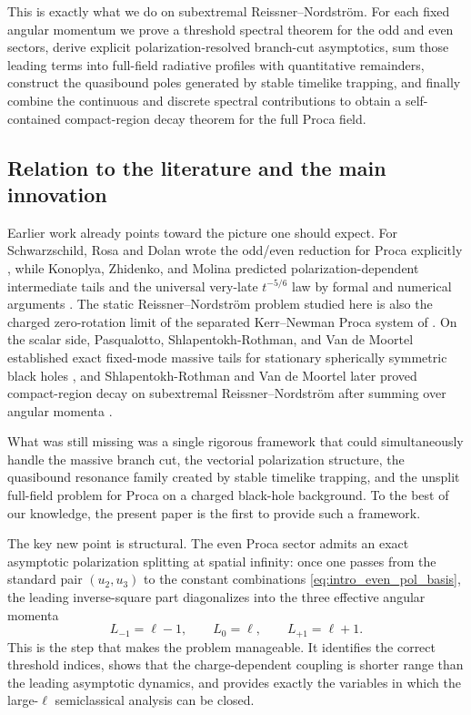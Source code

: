 \documentclass[12pt]{article}
\numberwithin{equation}{section}
\theoremstyle{plain}
\theoremstyle{definition}
\theoremstyle{remark}
\begin{document}
This is exactly what we do on subextremal Reissner--Nordstr\"om.  For each fixed angular momentum we prove a threshold spectral theorem for the odd and even sectors, derive explicit polarization-resolved branch-cut asymptotics, sum those leading terms into full-field radiative profiles with quantitative remainders, construct the quasibound poles generated by stable timelike trapping, and finally combine the continuous and discrete spectral contributions to obtain a self-contained compact-region decay theorem for the full Proca field.

\subsection{Relation to the literature and the main innovation}

Earlier work already points toward the picture one should expect.  For Schwarzschild, Rosa and Dolan wrote the odd/even reduction for Proca explicitly \cite{RosaDolan2012}, while Konoplya, Zhidenko, and Molina predicted polarization-dependent intermediate tails and the universal very-late $t^{-5/6}$ law by formal and numerical arguments \cite{KonoplyaZhidenkoMolina2007}.  The static Reissner--Nordstr\"om problem studied here is also the charged zero-rotation limit of the separated Kerr--Newman Proca system of \cite{CayusoDiasGrayKubiznakMargalitSantosSouzaThiele2020}.  On the scalar side, Pasqualotto, Shlapentokh-Rothman, and Van de Moortel established exact fixed-mode massive tails for stationary spherically symmetric black holes \cite{PasqualottoShlapentokhRothmanVanDeMoortel2024}, and Shlapentokh-Rothman and Van de Moortel later proved compact-region decay on subextremal Reissner--Nordstr\"om after summing over angular momenta \cite{ShlapentokhRothmanVanDeMoortel2026}.

What was still missing was a single rigorous framework that could simultaneously handle the massive branch cut, the vectorial polarization structure, the quasibound resonance family created by stable timelike trapping, and the unsplit full-field problem for Proca on a charged black-hole background.  To the best of our knowledge, the present paper is the first to provide such a framework.

The key new point is structural.  The even Proca sector admits an exact asymptotic polarization splitting at spatial infinity: once one passes from the standard pair $(u_2,u_3)$ to the constant combinations \eqref{eq:intro_even_pol_basis}, the leading inverse-square part diagonalizes into the three effective angular momenta
\[
   L_{-1}=\ell-1,
   \qquad
   L_0=\ell,
   \qquad
   L_{+1}=\ell+1.
\]
This is the step that makes the problem manageable.  It identifies the correct threshold indices, shows that the charge-dependent coupling is shorter range than the leading asymptotic dynamics, and provides exactly the variables in which the large-$\ell$ semiclassical analysis can be closed.
\end{document}
